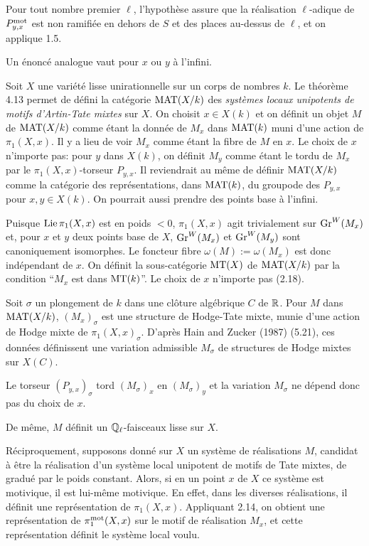 Pour tout nombre premier $\ell$, l'hypoth\`ese
assure que la r\'ealisation $\ell$-adique de
$P_{y,x}^{\text{\rm mot}}$ est non ramifi\'ee en dehors
de $S$ et des places au-dessus de $\ell$, et on
applique 1.5.
\enddemo

Un \'enonc\'e analogue vaut pour $x$ ou $y$ \`a
l'infini.
\endremark


\endsubhead
Soit $X$ une vari\'et\'e lisse unirationnelle
sur un corps de nombres $k$.
Le th\'eor\`eme 4.13 permet de d\'efini la
cat\'egorie 
$\text{\rm MAT}(X/k)$ des {\it syst\`emes locaux
unipotents de motifs d'Artin-Tate mixtes} sur
$X$.
On choisit $x\in X(k)$ et on d\'efinit un
objet $M$ de $\text{\rm MAT}(X/k)$ comme \'etant la
donn\'ee de $M_x$ dans $\text{\rm MAT}(k)$ muni d'une
action de $\pi_1(X,x)$.
Il y a lieu de voir $M_x$ comme \'etant la
fibre de $M$ en $x$.
Le choix de $x$ n'importe pas: pour $y$ dans
$X(k)$, on d\'efinit $M_y$ comme \'etant le
tordu de $M_x$ par le $\pi_1(X,x)$-torseur
$P_{y,x}$.
Il reviendrait au m\^{e}me de d\'efinir
$\text{\rm MAT}(X/k)$ comme la cat\'egorie des 
repr\'esentations, dans $\text{\rm MAT}(k)$, du
groupo{\umi}de des $P_{y,x}$ pour $x,y\in
X(k)$.
On pourrait aussi prendre des points base \`a
l'infini.

Puisque $\text{\rm Lie}\,\pi_1(X,x)$ est en poids $<0$,
$\pi_1(X,x)$ agit trivialement sur
$\text{\rm Gr}^W(M_x)$ et, pour $x$ et $y$ deux  points
base de $X$, $\text{\rm Gr}^W(M_x)$ et $\text{\rm Gr}^W(M_y)$ sont
canoniquement isomorphes.
Le foncteur fibre $\omega(M):=\omega(M_x)$ est
donc 
ind\'ependant de $x$.
On d\'efinit la sous-cat\'egorie $\text{\rm MT}(X)$ de
$\text{\rm MAT}(X/k)$ par la condition ``$M_x$ est dans
$\text{\rm MT}(k)$''.
Le choix de $x$ n'importe pas (2.18).

\endsubhead
Soit $\sigma$ un plongement de $k$ dans une
cl\^{o}ture alg\'ebrique $C$ de ${\Bbb R}$.
Pour $M$ dans $\text{\rm MAT}(X/k)$, $(M_x)_\sigma$ est
une structure de Hodge-Tate mixte, munie d'une
action de Hodge mixte de $\pi_1(X,x)_\sigma$.
D'apr\`es Hain and Zucker (1987) (5.21),
ces donn\'ees d\'efinissent
une variation admissible $M_\sigma$ de
structures de Hodge mixtes sur $X(C)$.

Le torseur $(P_{y,x})_\sigma$ tord $(M_\sigma)_x$ 
en $(M_\sigma)_y$ et la variation $M_\sigma$ ne 
d\'epend donc pas du choix de $x$.

De m\^{e}me, $M$ d\'efinit un
${\Bbb Q}_\ell$-faisceaux lisse sur $X$.

\endsubhead
R\'eciproquement, supposons donn\'e sur $X$ un
syst\`eme de r\'ealisations $M$, candidat \`a
\^{e}tre la r\'ealisation d'un syst\`eme local
unipotent de motifs de Tate mixtes, de
gradu\'e par le poids constant.
Alors, si en un point $x$ de $X$ ce syst\`eme
est motivique, il est lui-m\^{e}me motivique.
En effet, dans les diverses r\'ealisations, il
d\'efinit une repr\'esentation de
$\pi_1(X,x)$.
Appliquant 2.14, on obtient une
repr\'esentation de $\pi_1^{\text{\rm mot}}(X,x)$ sur
le motif de r\'ealisation $M_x$, et cette
repr\'esentation d\'efinit le syst\`eme local
voulu.

